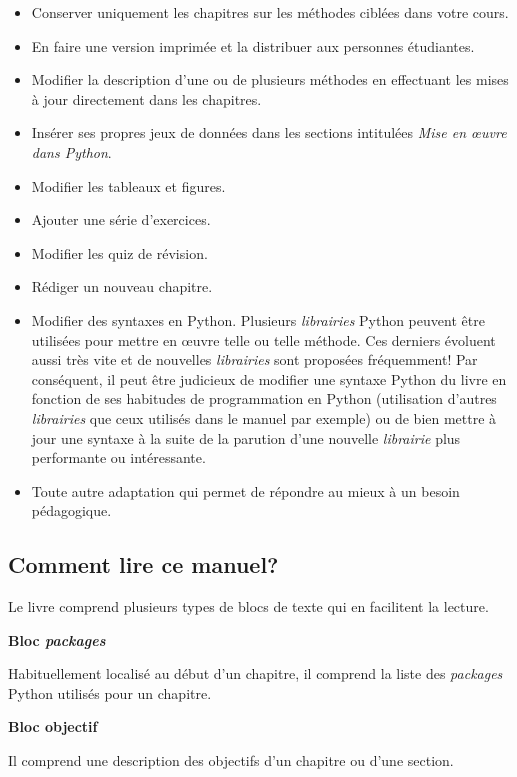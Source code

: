 \documentclass[
]{article}
\begin{document}
\begin{itemize}
\item
  Conserver uniquement les chapitres sur les méthodes ciblées dans votre
  cours.
\item
  En faire une version imprimée et la distribuer aux personnes
  étudiantes.
\item
  Modifier la description d'une ou de plusieurs méthodes en effectuant
  les mises à jour directement dans les chapitres.
\item
  Insérer ses propres jeux de données dans les sections intitulées
  \emph{Mise en œuvre dans Python}.
\item
  Modifier les tableaux et figures.
\item
  Ajouter une série d'exercices.
\item
  Modifier les quiz de révision.
\item
  Rédiger un nouveau chapitre.
\item
  Modifier des syntaxes en Python. Plusieurs \emph{librairies} Python
  peuvent être utilisées pour mettre en œuvre telle ou telle méthode.
  Ces derniers évoluent aussi très vite et de nouvelles
  \emph{librairies} sont proposées fréquemment! Par conséquent, il peut
  être judicieux de modifier une syntaxe Python du livre en fonction de
  ses habitudes de programmation en Python (utilisation d'autres
  \emph{librairies} que ceux utilisés dans le manuel par exemple) ou de
  bien mettre à jour une syntaxe à la suite de la parution d'une
  nouvelle \emph{librairie} plus performante ou intéressante.
\item
  Toute autre adaptation qui permet de répondre au mieux à un besoin
  pédagogique.
\end{itemize}

\label{sect002}
\subsection*{Comment lire ce manuel?}\label{comment-lire-ce-manuel}

Le livre comprend plusieurs types de blocs de texte qui en facilitent la
lecture.

\textbf{Bloc \emph{packages}}

Habituellement localisé au début d'un chapitre, il comprend la liste des
\emph{packages} Python utilisés pour un chapitre.

\textbf{Bloc objectif}

Il comprend une description des objectifs d'un chapitre ou d'une
section.
\end{document}
